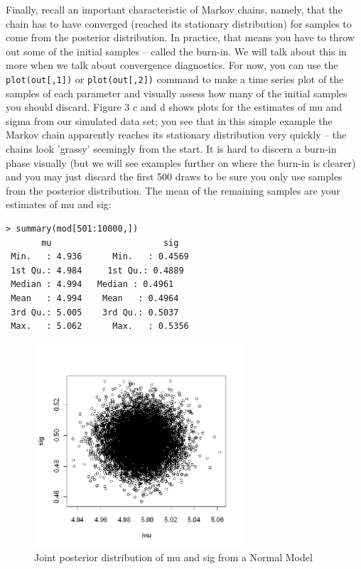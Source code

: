 Finally, recall an important characteristic of Markov chains, namely,
that the chain has to have converged (reached its stationary
distribution) for samples to come from the posterior distribution. In
practice, that means you have to throw out some of the initial samples
– called the burn-in. We will talk about this in more when we talk
about convergence diagnostics. For now, you can use the
\verb#plot(out[,1])# or \verb#plot(out[,2])# command to make a time
series plot of the samples of each parameter and visually assess how
many of the initial samples you should discard. Figure 3 c and d shows
plots for the estimates of mu and sigma from our simulated data set;
you see that in this simple example the Markov chain apparently
reaches its stationary distribution very quickly – the chains look
'grassy' seemingly from the start. It is hard to discern a burn-in
phase visually (but we will see examples further on where the burn-in
is clearer) and you may just discard the first 500 draws to be sure
you only use samples from the posterior distribution. The mean of the
remaining samples are your estimates of mu and sig: 
\begin{verbatim}
> summary(mod[501:10000,])
       mu                      sig        
 Min.   : 4.936      Min.   : 0.4569  
 1st Qu.: 4.984     1st Qu.: 0.4889  
 Median : 4.994   Median : 0.4961  
 Mean   : 4.994    Mean   : 0.4964  
 3rd Qu.: 5.005    3rd Qu.: 0.5037  
 Max.   : 5.062      Max.   : 0.5356  
\end{verbatim}

\begin{figure}
\begin{center}
\includegraphics[height=3in]{figs/postdist}
\end{center}
\caption{Joint posterior distribution of mu and sig from a Normal Model}
\label{postdist.fig}
\end{figure}

